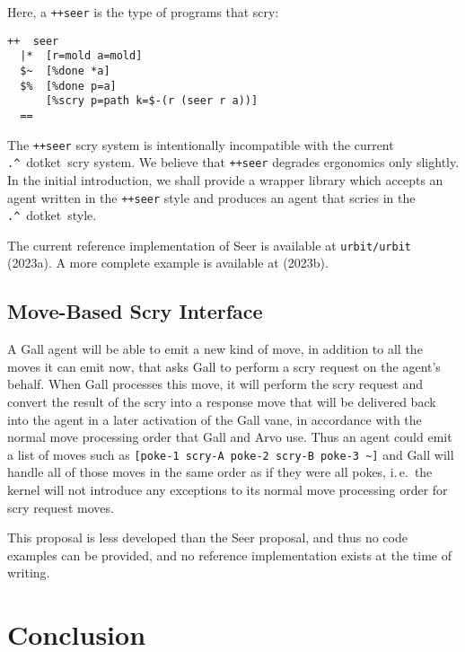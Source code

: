\documentclass[twoside]{article}
\newcommand{\dotket}{\lstinline[style=inlinecode]{.^}~dotket}
\begin{document}
Here, a \lstinline[style=inlinecode]{++seer} is the type of programs that scry:

\begin{lstlisting}[style=listingcode]
++  seer
  |*  [r=mold a=mold]
  $~  [%done *a]
  $%  [%done p=a]
      [%scry p=path k=$-(r (seer r a))]
  ==
\end{lstlisting}

The \lstinline[style=inlinecode]{++seer} scry system is intentionally incompatible with the current \dotket~scry system.  We believe that \lstinline[style=inlinecode]{++seer} degrades ergonomics only slightly.  In the initial introduction, we shall provide a wrapper library which accepts an agent written in the \lstinline[style=inlinecode]{++seer} style and produces an agent that scries in the \dotket~style.

The current reference implementation of Seer is available at \texttt{urbit/urbit}  (2023a).  A more complete example is available at  (2023b).

\subsection{Move-Based Scry Interface}

A Gall agent will be able to emit a new kind of move, in addition to all the moves it can emit now, that asks Gall to perform a scry request on the agent's behalf.  When Gall processes this move, it will perform the scry request and convert the result of the scry into a response move that will be delivered back into the agent in a later activation of the Gall vane, in accordance with the normal move processing order that Gall and Arvo use.  Thus an agent could emit a list of moves such as \lstinline[style=inlinecode]{[poke-1 scry-A poke-2 scry-B poke-3 ~]} and Gall will handle all of those moves in the same order as if they were all pokes, i.\,e.\ the kernel will not introduce any exceptions to its normal move processing order for scry request moves.

This proposal is less developed than the Seer proposal, and thus no code examples can be provided, and no reference implementation exists at the time of writing.


\section{Conclusion}
\end{document}
